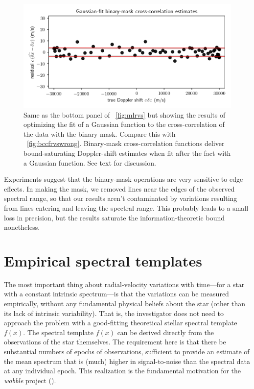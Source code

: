 \documentclass[modern]{aastex631}
\newcommand{\project}[1]{\textsl{#1}}
\newcommand{\wobble}{\project{wobble}}
\newcommand{\figref}[1]{\figurename~\ref{#1}}
\begin{document}
\begin{figure}[tp]
  \begin{mdframed}
    \begin{center}
    \includegraphics[width=\textwidth]{../notebook/bccfrvs.png}
    \end{center}
    \caption{Same as the bottom panel of \figref{fig:mlrvs} but showing the results of optimizing the fit of a Gaussian function to the cross-correlation of the data with the binary mask. Compare this with \figref{fig:bccfrvswrong}. Binary-mask cross-correlation functions deliver bound-saturating Doppler-shift estimates when fit after the fact with a Gaussian function. See text for discussion.\label{fig:bccfrvs}}
  \end{mdframed}
\end{figure}

Experiments suggest that the binary-mask operations are very sensitive to edge effects.
In making the mask, we removed lines near the edges of the observed spectral range, so that our results aren't contaminated by variations resulting from lines entering and leaving the spectral range.
This probably leads to a small loss in precision, but the results saturate the information-theoretic bound nonetheless.

\section{Empirical spectral templates}\label{sec:templates}

The most important thing about radial-velocity variations with time---for a star with a constant intrinsic spectrum---is that the variations can be measured empirically, without any fundamental physical beliefs about the star (other than its lack of intrinsic variability).
That is, the investigator does not need to approach the problem with a good-fitting theoretical stellar spectral template $f(x)$.
The spectral template $f(x)$ can be derived directly from the observations of the star themselves.
The requirement here is that there be substantial numbers of epochs of observations, sufficient to provide an estimate of the mean spectrum that is (much) higher in signal-to-noise than the spectral data at any individual epoch.
This realization is the fundamental motivation for the \wobble{} project (\citealt{wobble}).
\end{document}
